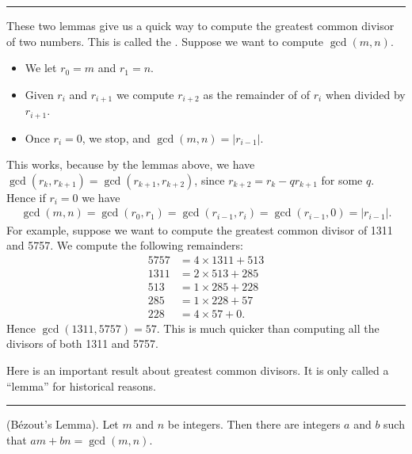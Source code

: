 \documentclass[letterpaper,10pt,english]{sphinxmanual}
\begin{document}
\bigskip\hrule\bigskip


\sphinxAtStartPar
These two lemmas give us a quick way to compute the greatest common divisor of two numbers. This is called the . Suppose we want to compute \(\gcd(m, n)\).
\begin{itemize}
\item {} 
\sphinxAtStartPar
We let \(r_0 = m\) and \(r_1 = n\).

\item {} 
\sphinxAtStartPar
Given \(r_i\) and \(r_{i+1}\) we compute \(r_{i+2}\) as the remainder of of \(r_i\) when divided by \(r_{i+1}\).

\item {} 
\sphinxAtStartPar
Once \(r_i = 0\), we stop, and \(\gcd(m, n) = |r_{i-1}|\).

\end{itemize}

\sphinxAtStartPar
This works, because by the lemmas above, we have \(\gcd(r_k,r_{k+1}) = \gcd(r_{k+1}, r_{k+2})\), since \(r_{k+2} = r_k - qr_{k+1}\) for some \(q\). Hence if \(r_i=0\) we have
\begin{equation*}
\begin{split}\gcd(m,n)=\gcd(r_0,r_1)=\gcd(r_{i-1},r_i)=\gcd(r_{i-1},0)=|r_{i-1}|.\end{split}
\end{equation*}
\sphinxAtStartPar
For example, suppose we want to compute the greatest common divisor of 1311 and 5757. We compute the following remainders:
\begin{equation*}
\begin{split}5757 &= 4\times1311 + 513\\
1311 &= 2\times513 + 285\\
513 &= 1\times285 + 228\\
285 &= 1\times228 + 57\\
228 &= 4\times57 + 0.\end{split}
\end{equation*}
\sphinxAtStartPar
Hence \(\gcd(1311,5757) = 57\). This is much quicker than computing all the divisors of both 1311 and 5757.

\sphinxAtStartPar
Here is an important result about greatest common divisors. It is only called a “lemma” for historical reasons.


\bigskip\hrule\bigskip


\sphinxAtStartPar
{} (B‎ézout’s Lemma). Let \(m\) and \(n\) be integers. Then there are integers \(a\) and \(b\) such that \(am+bn=\gcd(m,n)\).
\end{document}
